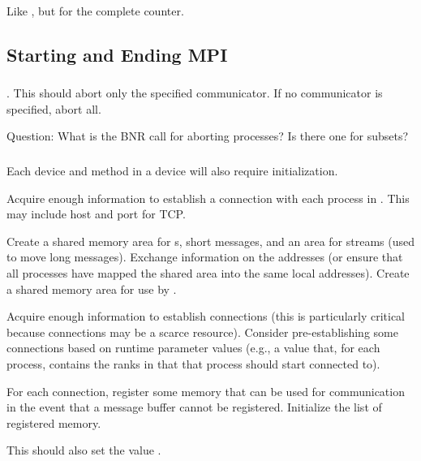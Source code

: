 \documentclass{article}
\begin{document}
Like , but for the complete counter.



\subsection{Starting and Ending MPI}

\subsubsection{}
\begin{adi3}
.  This should abort only the specified communicator.  If
no communicator is specified, abort all.  

Question: What is the BNR call for aborting processes?  Is there one for
subsets?  
\end{adi3}

\subsubsection{}
\begin{adi3}
Each device and method in a device will also require initialization.  
\begin{tcp}
Acquire enough information to establish a connection with each process
in .  This may include host and port for
TCP.  
\end{tcp}
\begin{shmem}
Create a shared memory area for s, short
messages, and an area for streams (used to move long messages).
Exchange information on the addresses (or ensure that all 
processes have mapped the shared area into the same local addresses).
Create a shared memory area for use by .
\end{shmem}
\begin{via}
Acquire enough information to establish connections (this is
particularly critical because connections may be a scarce resource).  
Consider pre-establishing some connections based on runtime parameter
values (e.g., a  value that, for each
process, contains the ranks in  that that
process should start connected to).  

For each connection, register some memory that can be used for
communication in the event that a message buffer cannot be registered.
Initialize the list of registered memory.
\end{via}
\end{adi3}
This should also set the value .
\end{document}
